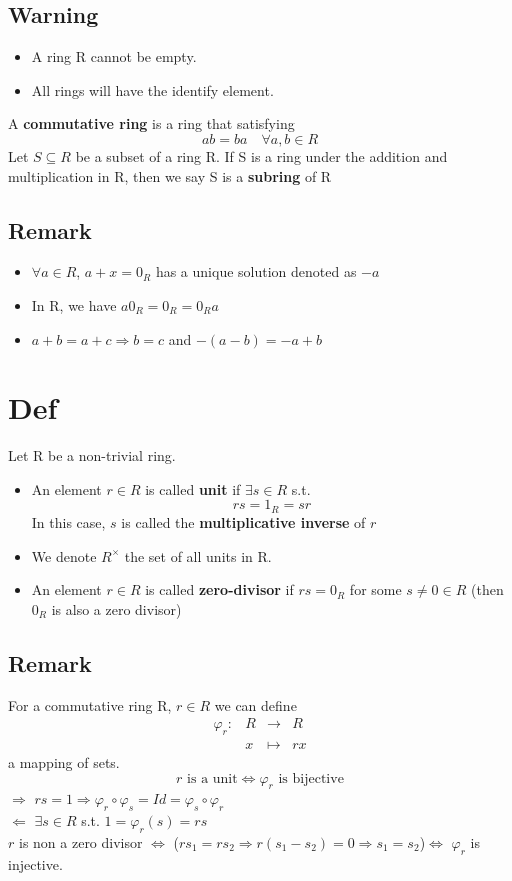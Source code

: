 \documentclass{book}
\begin{document}
\subsection*{Warning}
\begin{itemize}
	\item A ring R cannot be empty.
	\item All rings will have the identify element.
\end{itemize}
A \textbf{commutative ring} is a ring that satisfying$$ab=ba\quad\forall a,b\in R$$
Let $S\subseteq R$ be a subset of a ring R. If S is a ring under the addition and multiplication in R, then  we say S is a \textbf{subring} of R
\subsection*{Remark}\begin{itemize}
	\item $\forall a\in R$, $a+x=0_R$ has a unique solution denoted as $-a$
	\item In R, we have $a0_R=0_R=0_Ra$
	\item $a+b=a+c\Rightarrow b=c$ and $-(a-b)=-a+b$
\end{itemize}
\section{Def}Let R be a non-trivial ring. 
\begin{itemize}
	\item An element $r\in R$ is called \textbf{unit} if $\exists s\in R$ s.t. $$rs=1_R=sr$$In this case, $s$ is called the \textbf{multiplicative inverse} of $r$
	\item We denote $R^\times$ the set of all units in R.
	\item An element $r\in R$ is called \textbf{zero-divisor} if $rs=0_R$ for some $s\neq 0\in R$ (then $0_R$ is also a zero divisor)
\end{itemize}
\subsection*{Remark}For a commutative ring R, $r\in R$ we can define $$\begin{aligned}
	\varphi_r: &R&\rightarrow&R\\ &x&\mapsto&rx
\end{aligned}$$
a mapping of sets.$$r\text{ is a unit}\Leftrightarrow\varphi_r\text{ is bijective}$$
$\Rightarrow$ $rs=1\Rightarrow \varphi_r\circ\varphi_s=Id=\varphi_s\circ\varphi_r$\\
$\Leftarrow$ $\exists s\in R$ s.t. $1=\varphi_r(s)=rs$\\
$r$ is non a zero divisor $\Leftrightarrow$ ($rs_1=rs_2\Rightarrow r(s_1-s_2)=0\Rightarrow s_1=s_2$)$\Leftrightarrow$ $\varphi_r$ is injective.
\end{document}
